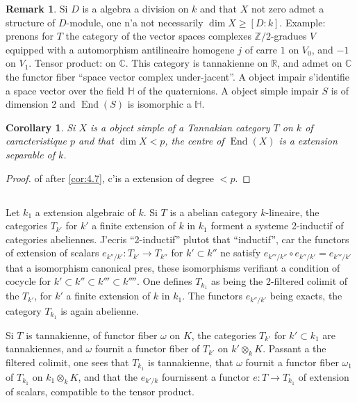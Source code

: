 \documentclass[11pt,a4paper]{article}
\theoremstyle{plain}
\newtheorem{corollary}[theorem]{Corollary}
\theoremstyle{definition}
\newtheorem{remark}[theorem]{Remark}
\DeclareMathOperator{\End}{End}
\begin{document}
\begin{remark}\label{rem:4.8}
Si $D$ is a algebra a division on $k$ and that $X$ not zero admet a structure of $D$-module, one n'a not necessarily $\dim X \geq [D:k]$. Example: prenons for $T$ the category of the vector spaces complexes $\mathbb{Z}/2$-gradues $V$ equipped with a automorphism antilineaire homogene $j$ of carre $1$ on $V_0$, and $-1$ on $V_1$. Tensor product: on $\mathbb{C}$. This category is tannakienne on $\mathbb{R}$, and admet on $\mathbb{C}$ the functor fiber ``space vector complex under-jacent''. A object impair s'identifie a space vector over the field $\mathbb{H}$ of the quaternions. A object simple impair $S$ is of dimension 2 and $\End(S)$ is isomorphic a $\mathbb{H}$.
\end{remark}

\begin{corollary}\label{cor:4.9}
Si $X$ is a object simple of a Tannakian category $T$ on $k$ of caracteristique $p$ and that $\dim X < p$, the centre of $\End(X)$ is a extension separable of $k$.
\end{corollary}

\begin{proof}
of after \ref{cor:4.7}, c'is a extension of degree $< p$.
\end{proof}

\subsection{}
Let $k_1$ a extension algebraic of $k$. Si $T$ is a abelian category $k$-lineaire, the categories $T_{k'}$ for $k'$ a finite extension of $k$ in $k_1$ forment a systeme 2-inductif of categories abeliennes. J'ecris ``2-inductif'' plutot that ``inductif'', car the functors of extension of scalars $e_{k''/k'}: T_{k'} \to T_{k''}$ for $k' \subset k''$ ne satisfy $e_{k'''/k''} \circ e_{k''/k'} = e_{k'''/k'}$ that a isomorphism canonical pres, these isomorphisms verifiant a condition of cocycle for $k' \subset k'' \subset k''' \subset k''''$. One defines $T_{k_1}$ as being the 2-filtered colimit of the $T_{k'}$, for $k'$ a finite extension of $k$ in $k_1$. The functors $e_{k''/k'}$ being exacts, the category $T_{k_1}$ is again abelienne.

Si $T$ is tannakienne, of functor fiber $\omega$ on $K$, the categories $T_{k'}$ for $k' \subset k_1$ are tannakiennes, and $\omega$ fournit a functor fiber of $T_{k'}$ on $k' \otimes_k K$. Passant a the filtered colimit, one sees that $T_{k_1}$ is tannakienne, that $\omega$ fournit a functor fiber $\omega_1$ of $T_{k_1}$ on $k_1 \otimes_k K$, and that the $e_{k'/k}$ fournissent a functor $e: T \to T_{k_1}$ of extension of scalars, compatible to the tensor product.
\end{document}

